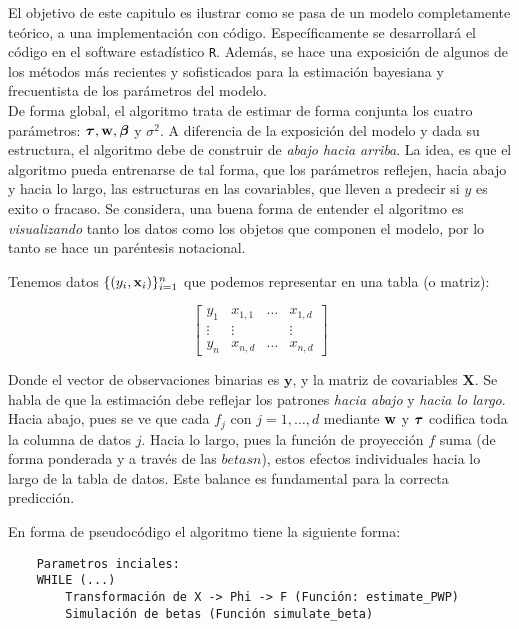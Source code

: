 \documentclass[../Main/Main.tex]{subfiles}
\begin{document}
El objetivo de este capitulo es ilustrar como se pasa de un modelo completamente teórico, a una implementación con código. Específicamente se desarrollará el código en el software estadístico \verb|R|. Además, se hace una exposición  de algunos de los métodos más recientes y sofisticados para la estimación bayesiana y frecuentista de los parámetros del modelo. \\

De forma global, el algoritmo trata de estimar de forma conjunta los cuatro parámetros: $\boldsymbol{\tau}, \mathbf{w}, \boldsymbol{\beta}$ y $\sigma^2$. A diferencia de la exposición del modelo y dada su estructura, el algoritmo debe de construir de \textit{abajo hacia arriba}. La idea, es que el algoritmo pueda entrenarse de tal forma, que los parámetros reflejen, hacia abajo y hacia lo largo, las estructuras en las covariables, que lleven a predecir si $y$ es exito o fracaso. Se considera, una buena forma de entender el algoritmo es \textit{visualizando} tanto los datos como los objetos que componen el modelo, por lo tanto se hace un paréntesis  notacional.

Tenemos datos $\{(y_i,\mathbf{x}_i)\}_{i = 1}^n$ que podemos representar en una tabla (o matriz):

$$\left[\begin{array}{c|ccc} 
y_1 & x_{1,1} & \ldots & x_{1,d} \\ 
\vdots & \vdots & ~ & \vdots \\ 
y_n & x_{n,d} & \ldots & x_{n,d}
\end{array}\right]$$

Donde el vector de observaciones binarias es $\mathbf{y}$, y la matriz de covariables $\mathbf{X}$. Se habla de que la estimación debe reflejar los patrones \textit{hacia abajo} y \textit{hacia lo largo}. Hacia abajo, pues se ve que cada $f_j$ con $j = 1,\ldots,d$ mediante $\mathbf{w}$ y $\boldsymbol{\tau}$ codifica toda la columna de datos $j$. Hacia lo largo, pues la función de proyección $f$ suma (de forma ponderada y a través de las $betasn$), estos efectos individuales hacia lo largo de la tabla de datos. Este balance es fundamental para la correcta predicción.

En forma de pseudocódigo el algoritmo tiene la siguiente forma:

\begin{verbatim}
    Parametros inciales: 
    WHILE (...)
        Transformación de X -> Phi -> F (Función: estimate_PWP)		
        Simulación de betas (Función simulate_beta)
\end{verbatim} 
\end{document}
